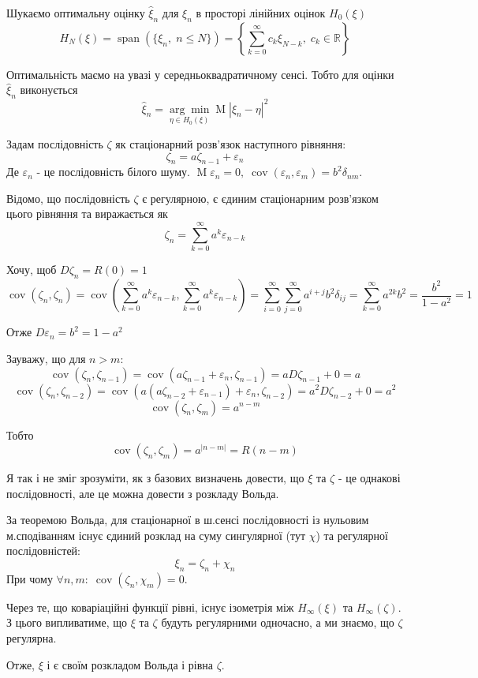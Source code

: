 \documentclass[11pt, a4paper]{article} %
\DeclareMathOperator{\cov}{cov}
\begin{document}
Шукаємо оптимальну оцінку $\hat\xi_n$ для $\xi_n$ в просторі лінійних оцінок $H_0(\xi)$ 
\[H_N(\xi) = \operatorname{span}\left(\{\xi_n,\; n\le N\}\right) = \left\{\sum_{k=0}^\infty c_k \xi_{N-k},\; c_k \in \mathbb R \right\}\]

Оптимальність маємо на увазі у середньоквадратичному сенсі. Тобто для оцінки $\hat\xi_n$ виконується
\[\hat\xi_n = \underset{\eta \in H_0(\xi)}{\arg\min} \operatorname{M}\left|\xi_n - \eta\right|^2\]

Задам послідовність $\zeta$ як стаціонарний розв'язок наступного рівняння:
\[\zeta_{n} = a\zeta_{n-1} + \varepsilon_n\]
Де $\varepsilon_n$ - це послідовність білого шуму. $\operatorname{M} \varepsilon_n = 0, \;\cov(\varepsilon_n,\varepsilon_m) = b^2\delta_{nm}$.

Відомо, що послідовність $\zeta$ є регулярною, є єдиним стаціонарним розв'язком цього рівняння та виражається як
\[\zeta_n = \sum_{k=0}^\infty a^k\varepsilon_{n-k}\]

Хочу, щоб $D\zeta_n = R(0) = 1$
\[\cov(\zeta_n, \zeta_n) = \cov\left(\sum_{k=0}^\infty a^k\varepsilon_{n-k},\sum_{k=0}^\infty a^k\varepsilon_{n-k}\right) = \sum_{i=0}^\infty\sum_{j=0}^\infty a^{i+j}b^2\delta_{ij} = \sum_{k=0}^\infty a^{2k}b^2 = \frac{b^2}{1-a^2} = 1\]

Отже $D\varepsilon_n = b^2 = 1-a^2$

Зауважу, що для $n>m$:
\[\cov(\zeta_n, \zeta_{n-1}) = \cov(a\zeta_{n-1} + \varepsilon_n, \zeta_{n-1}) = aD\zeta_{n-1} + 0 = a\]
\[\cov(\zeta_n, \zeta_{n-2}) = \cov(a(a\zeta_{n-2} + \varepsilon_{n-1}) + \varepsilon_n, \zeta_{n-2}) = a^2D\zeta_{n-2} + 0 = a^2\]
\[\cov(\zeta_n, \zeta_m) = a^{n-m}\]

Тобто
\[\cov(\zeta_n,\zeta_m) = a^{|n-m|} = R(n-m)\]

Я так і не зміг зрозуміти, як з базових визначень довести, що $\xi$ та $\zeta$ - це однакові послідовності,
але це можна довести з розкладу Вольда. 

За теоремою Вольда, для стаціонарної в ш.сенсі послідовності із нульовим м.сподіванням існує єдиний розклад на суму сингулярної (тут $\chi$) та регулярної послідовністей:
\[\xi_n = \zeta_n + \chi_n\]
При чому $\forall n,m:\; \cov(\zeta_n, \chi_m) = 0$.

Через те, що коваріаційні функції рівні, існує ізометрія між $H_{\infty}(\xi)$ та $H_\infty(\zeta)$. З цього випливатиме, що $\xi$ та $\zeta$ будуть регулярними одночасно, а ми знаємо, що $\zeta$ регулярна.

Отже, $\xi$ і є своїм розкладом Вольда і рівна $\zeta$.
\end{document}
